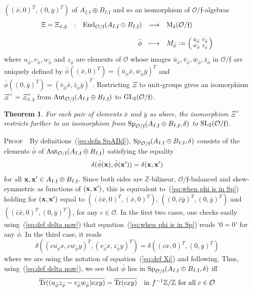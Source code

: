 \documentclass[12pt]{article}
\newtheorem{thm}{Theorem}[section]
\newcommand{\addwords}[1]{\ \ \ \mbox{#1}}
\newcommand{\Aut}{{\rm Aut}}
\newcommand{\bbZ}{\ensuremath{\mathbb{Z}}}
\newcommand{\bPf}{\noindent \textsc{Proof\ }}
\newcommand{\bx}{\ensuremath{{\bf x}}}
\newcommand{\cB}{\ensuremath{\mathcal{B}}}
\newcommand{\cO}{\ensuremath{\mathcal{O}}}
\newcommand{\displaymapdef}[5]
{
	\begin{array}{rcrcl}
		#1 &:& #2 &\longrightarrow& #3 \\
		& &    &                    \\
		& & #4 &\longmapsto    & #5
	\end{array}
}
\newcommand{\End}{{\rm End}}
\newcommand{\ff}{\ensuremath{\mathfrak{f}}}
\newcommand{\GL}{{\rm GL}}
\newcommand{\inv}{^{-1}}%
\newcommand{\SL}{{\rm SL}}
\newcommand{\smallttmat}[4] %
{
	\left( \begin{smallmatrix}
		#1&#2\\ #3&#4
	\end{smallmatrix} \right)
}
\newcommand{\Tr}{{\rm Tr}}
\newcommand{\Zunder}[1]{#1 \inv\bbZ/\bbZ}
\newcommand{\AIdsB}{\ensuremath{A_{I,\ff}\oplus B_{I,\ff}}}
\newcommand{\barphi}[1]{\bar{#1}_{\bar \phi}}
\newcommand{\Of}{{\cO/\ff}}
\begin{document}
 $
% 
((\bar x,0)^T,(0,\bar y)^T)
 $  
 of $\AIdsB$ and so an isomorphism of $\Of$-algebras
\begin{equation}\label{eq:def Xi}
\displaymapdef{\Xi=\Xi_{\bar x,\bar y}}
{\End_\Of(\AIdsB)}{{\rm M}_2(\Of)}{\bar \phi}{M_{\bar \phi}:=
\smallttmat{\bar u_{\bar \phi}}{\bar v_{\bar \phi}}{\bar w_{\bar \phi}}{\bar z_{\bar \phi}}
}
\end{equation}
where $u_{\bar\phi}, v_{\bar\phi}, w_{\bar\phi}$ and $z_{\bar\phi}$ are elements of $\cO$ whose images  $\barphi{u},\barphi{v},\barphi{w},\barphi{z}$ in $\Of$ are uniquely defined by  
$\bar \phi((\bar x,0)^T)=(\barphi{u}\bar x,\barphi{w}\bar y)^T$ and    
$\bar \phi((0,\bar y)^T)=(\barphi{v}\bar x,\barphi{z}\bar y)^T$. 
Restricting $\Xi$ to unit-groups gives an isomorphism 
$\Xi^\times=\Xi^\times_{\bar x,\bar y}$ from $\Aut_\Of(\AIdsB)$ to $\GL_2(\Of)$. 
\begin{thm}\label{thm: Sp iso to SL in general arithmetic case} For each pair of elements $\bar x$ and $\bar y$ as above, the isomorphism 
	$\Xi^\times$ restricts further to an isomorphism from 
	${\rm Sp}_{\Of}(A_{I,\ff}\oplus B_{I,\ff},\delta)$ to 
	$\SL_2(\Of)$.
\end{thm}
\bPf\ By definitions~(\ref{eq:defn SpABd}), ${\rm Sp}_{\Of}(A_{I,\ff}\oplus B_{I,\ff},\delta)$ consists of the elements $\bar \phi$ of $\Aut_\Of(\AIdsB)$ satisfying 
the equality 
\begin{equation}\label{eq:when phi is in Sp}
\delta(\bar\phi(\bx),\bar\phi(\bx'))=\delta(\bx,\bx')
\end{equation}
for all $\bx,\bx'\in\AIdsB$. Since both sides are $\bbZ$-bilinear, $\Of$-balanced and skew-symmetric as functions of $(\bx,\bx')$, this is equivalent to~(\ref{eq:when phi is in Sp}) holding for $(\bx,\bx')$ equal to $((\bar c\bar x,0)^T, (\bar x,0)^T)$,  
$((0,\bar c\bar y)^T, (0,\bar y)^T)$ and $((\bar c\bar x,0)^T,(0,\bar y)^T)$, for any $c\in \cO$. In the first two cases, one checks easily using~(\ref{eq:def delta now}) that equation~(\ref{eq:when phi is in Sp}) reads `$0=0$' for any $\bar\phi$. In the third case, it reads
$$ 
\delta((\overline{cu_{\bar \phi}x},
\overline{cw_{\bar \phi}y})^T,
(\overline{v_{\bar \phi}x},\overline{z_{\bar \phi}y})^T)=
\delta((\overline{cx},0)^T,(0,\overline{y})^T)
$$
where we are using the notation of equation~(\ref{eq:def Xi}) and following. Thus, using~(\ref{eq:def delta now}), we see that $\bar\phi$ 
lies in  ${\rm Sp}_{\Of}(A_{I,\ff}\oplus B_{I,\ff},\delta)$ iff
$$
\overline{\Tr((u_{\bar \phi}z_{\bar \phi}-v_{\bar \phi}w_{\bar \phi})cxy)}=\overline{\Tr(cxy)}
\addwords{in $\Zunder{f}$ for all $c\in\cO$}
$$ 
\end{document}
